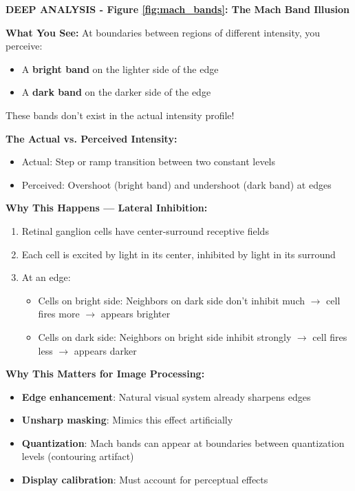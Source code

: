 \documentclass[12pt,a4paper]{article}
\begin{document}
\begin{deepexplanation}
\textbf{DEEP ANALYSIS - Figure \ref{fig:mach_bands}: The Mach Band Illusion}

\textbf{What You See:}
At boundaries between regions of different intensity, you perceive:
\begin{itemize}
    \item A \textbf{bright band} on the lighter side of the edge
    \item A \textbf{dark band} on the darker side of the edge
\end{itemize}
These bands don't exist in the actual intensity profile!

\textbf{The Actual vs. Perceived Intensity:}
\begin{itemize}
    \item Actual: Step or ramp transition between two constant levels
    \item Perceived: Overshoot (bright band) and undershoot (dark band) at edges
\end{itemize}

\textbf{Why This Happens --- Lateral Inhibition:}
\begin{enumerate}
    \item Retinal ganglion cells have center-surround receptive fields
    \item Each cell is excited by light in its center, inhibited by light in its surround
    \item At an edge:
    \begin{itemize}
        \item Cells on bright side: Neighbors on dark side don't inhibit much $\rightarrow$ cell fires more $\rightarrow$ appears brighter
        \item Cells on dark side: Neighbors on bright side inhibit strongly $\rightarrow$ cell fires less $\rightarrow$ appears darker
    \end{itemize}
\end{enumerate}

\textbf{Why This Matters for Image Processing:}
\begin{itemize}
    \item \textbf{Edge enhancement}: Natural visual system already sharpens edges
    \item \textbf{Unsharp masking}: Mimics this effect artificially
    \item \textbf{Quantization}: Mach bands can appear at boundaries between quantization levels (contouring artifact)
    \item \textbf{Display calibration}: Must account for perceptual effects
\end{itemize}
\end{deepexplanation}
\end{document}

